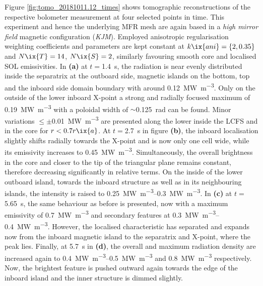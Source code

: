 %
            Figure \ref{fig:tomo_20181011.12_times} shows tomographic reconstructions of the respective bolometer measurement at four selected points in time. This experiment and hence the underlying MFR mesh are again based in a \textit{high mirror field} magnetic configuration (\textit{KJM}). Employed anisotropic regularisation weighting coefficients and parameters are kept constant at $k\ix{ani}=\left\{2, 0.35\right\}$ and $N\ix{T}=14$, $N\ix{S}=2$, similarly favouring smooth core and localised SOL emissivities. In \textbf{(a)} at $t=$\SI{1.4}{\second}, the radiation is near evenly distributed inside the separatrix at the outboard side, magnetic islands on the bottom, top and the inboard side domain boundary with around \SI{0.12}{\mega\watt\per\cubic\meter}. Only on the outside of the lower inboard X-point a strong and radially focused maximum of \SI{0.19}{\mega\watt\per\cubic\meter} with a poloidal width of $\sim$\SI{0.125}{\radian} can be found. Minor variations $\le\pm$\SI{0.01}{\mega\watt\per\cubic\meter} are presented along the lower inside the LCFS and in the core for $r<0.7r\ix{a}$. At $t=$\SI{2.7}{\second} in figure \textbf{(b)}, the inboard localisation slightly shifts radially towards the X-point and is now only one cell wide, while its emissivity increases to \SI{0.45}{\mega\watt\per\cubic\meter}. Simultaneously, the overall brightness in the core and closer to the tip of the triangular plane remains constant, therefore decreasing significantly in relative terms. On the inside of the lower outboard island, towards the inboard structure as well as in its neighbouring islands, the intensity is raised to \SIrange{0.25}{0.3}{\mega\watt\per\cubic\meter}. In \textbf{(c)} at $t=$\SI{5.65}{\second}, the same behaviour as before is presented, now with a maximum emissivity of \SI{0.7}{\mega\watt\per\cubic\meter} and secondary features at \SIrange{0.3}{0.4}{\mega\watt\per\cubic\meter}. However, the localised characteristic has separated and expands now from the inboard magnetic island to the separatrix and X-point, where the peak lies. Finally, at \SI{5.7}{\second} in \textbf{(d)}, the overall and maximum radiation density are increased again to \SIrange{0.4}{0.5}{\mega\watt\per\cubic\meter} and \SI{0.8}{\mega\watt\per\cubic\meter} respectively. Now, the brightest feature is pushed outward again towards the edge of the inboard island and the inner structure is dimmed slightly.\\%
